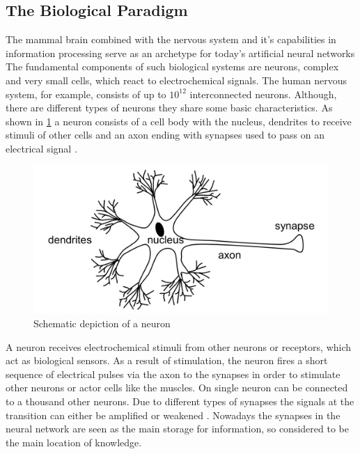 \documentclass[12pt,a4paper]{article}
\begin{document}
\subsection{The Biological Paradigm}
The mammal brain combined with the nervous system and it's capabilities in information processing serve as an archetype for today's artificial neural networks\cite{Rojas1996}
The fundamental components of such biological systems are neurons, complex and very small cells, which react to electrochemical signals.
The human nervous system, for example, consists of up to $10^{12}$ interconnected neurons.
Although, there are different types of neurons they share some basic characteristics. As shown in \ref{fig:neuron_schemantic} a neuron consists of a cell body with the nucleus, dendrites to receive stimuli of other cells and an axon ending with synapses used to pass on an electrical signal \cite{Patterson1997}.
\begin{figure}
    \centering
    \includegraphics[width=0.5\linewidth]{Figures/Neuron_schemantic_depiction.png}
    \caption{Schematic depiction of a neuron}
    \label{fig:neuron_schemantic}
\end{figure}
A neuron receives electrochemical stimuli from other neurons or receptors, which act as biological sensors.
As a result of stimulation, the neuron fires a short sequence of electrical pulses via the axon to the synapses in order to stimulate other neurons or actor cells like the muscles. On single neuron can be connected to a thousand other neurons. Due to different types of synapses the signals at the transition can either be amplified or weakened \cite{Patterson1997}.
Nowadays the synapses in the neural network are seen as the main storage for information, so considered to be the main location of knowledge\cite{Rojas1996}.
\end{document}
